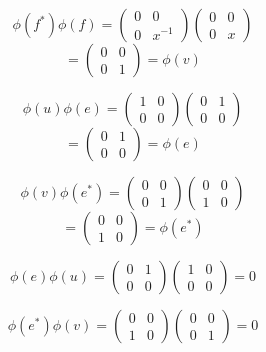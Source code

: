 \begin{solution}
    $$\phi(f^*)\phi(f)=\left(\begin{array}{cc} 0 & 0 \\ 0 & x^{-1} \end{array}\right)
    \left(\begin{array}{cc} 0 & 0 \\ 0 & x \end{array}\right)$$
    $$=\left(\begin{array}{cc} 0 & 0 \\ 0 & 1 \end{array}\right)=\phi(v)$$

    $$\phi(u)\phi(e)=\left(\begin{array}{cc} 1 & 0 \\ 0 & 0 \end{array}\right)
    \left(\begin{array}{cc} 0 & 1 \\ 0 & 0 \end{array}\right)$$
    $$=\left(\begin{array}{cc} 0 & 1 \\ 0 & 0 \end{array}\right)=\phi(e)$$

    $$\phi(v)\phi(e^*)=\left(\begin{array}{cc} 0 & 0 \\ 0 & 1 \end{array}\right)
    \left(\begin{array}{cc} 0 & 0 \\ 1 & 0 \end{array}\right)$$
    $$=\left(\begin{array}{cc} 0 & 0 \\ 1 & 0 \end{array}\right)=\phi(e^*)$$

    $$\phi(e)\phi(u)=\left(\begin{array}{cc} 0 & 1 \\ 0 & 0 \end{array}\right)
    \left(\begin{array}{cc} 1 & 0 \\ 0 & 0 \end{array}\right)=0$$

    $$\phi(e^*)\phi(v)=\left(\begin{array}{cc} 0 & 0 \\ 1 & 0 \end{array}\right)
    \left(\begin{array}{cc} 0 & 0 \\ 0 & 1 \end{array}\right)=0$$


\end{solution}

